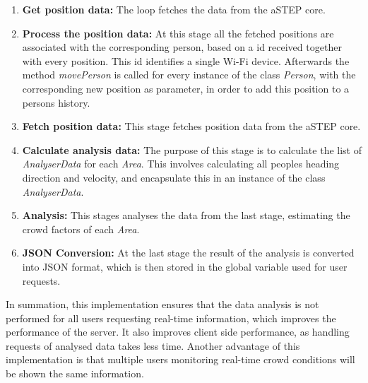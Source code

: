 \begin{enumerate}
	\item \textbf{Get position data:} The loop fetches the data from the aSTEP core.
    \item \textbf{Process the position data:} At this stage all the fetched positions are associated with the corresponding person, based on a id received together with every position. This id identifies a single Wi-Fi device. Afterwards the method \emph{movePerson} is called for every instance of the class \emph{Person}, with the corresponding new position as parameter, in order to add this position to a persons history.
    \item \textbf{Fetch position data:} This stage fetches position data from the aSTEP core.
    \item \textbf{Calculate analysis data:} The purpose of this stage is to calculate the list of \emph{AnalyserData} for each \emph{Area}. This involves calculating all peoples heading direction and velocity, and encapsulate this in an instance of the class \emph{AnalyserData}.
    \item \textbf{Analysis:} This stages analyses the data from the last stage, estimating the crowd factors of each \emph{Area}.
    \item \textbf{JSON Conversion:} At the last stage the result of the analysis is converted into JSON format, which is then stored in the global variable used for user requests. 
\end{enumerate}

In summation, this implementation ensures that the data analysis is not performed for all users requesting real-time information, which improves the performance of the server. It also improves client side performance, as handling requests of analysed data takes less time. Another advantage of this implementation is that multiple users monitoring real-time crowd conditions will be shown the same information.